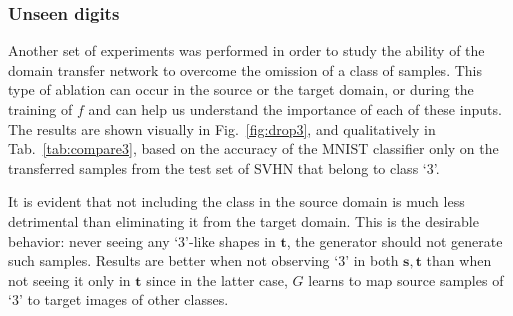 \documentclass{article} %
\begin{document}
\subsubsection{Unseen digits}

Another set of experiments was performed in order to study the ability of the domain transfer network to overcome the omission of a class of samples. This type of ablation can occur in the source or the target domain, or during the training of $f$ and can help us understand the importance of each of these inputs. The results are shown visually in Fig.~\ref{fig:drop3}, and qualitatively in Tab.~\ref{tab:compare3}, based on the accuracy of the MNIST classifier only on the transferred samples from the test set of SVHN that belong to class `3'. 

It is evident that not including the class in the source domain is much less detrimental than eliminating it from the target domain. This is the desirable behavior: never seeing any `3'-like shapes in $\mathbf t$, the generator should not generate such samples. Results are better when not observing `3' in both  $\mathbf s,\mathbf t$ than when not seeing it only in $\mathbf t$ since in the latter case, $G$ learns to map source samples of `3' to target images of other classes.
\end{document}
